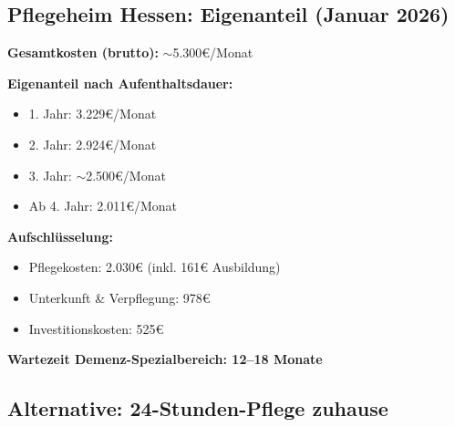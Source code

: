 \documentclass[11pt,a4paper]{article}
\begin{document}
\subsection{Pflegeheim Hessen: Eigenanteil (Januar 2026)}

\begin{infobox}
\textbf{Gesamtkosten (brutto):} $\sim$5.300\euro{}/Monat

\vspace{0.3cm}
\textbf{Eigenanteil nach Aufenthaltsdauer:}
\begin{itemize}[noitemsep]
    \item 1. Jahr: 3.229\euro{}/Monat
    \item 2. Jahr: 2.924\euro{}/Monat
    \item 3. Jahr: $\sim$2.500\euro{}/Monat
    \item Ab 4. Jahr: 2.011\euro{}/Monat
\end{itemize}

\vspace{0.3cm}
\textbf{Aufschlüsselung:}
\begin{itemize}[noitemsep]
    \item Pflegekosten: 2.030\euro{} (inkl. 161\euro{} Ausbildung)
    \item Unterkunft \& Verpflegung: 978\euro{}
    \item Investitionskosten: 525\euro{}
\end{itemize}

\vspace{0.3cm}
\textbf{Wartezeit Demenz-Spezialbereich: 12--18 Monate}
\end{infobox}

\subsection{Alternative: 24-Stunden-Pflege zuhause}
\end{document}
